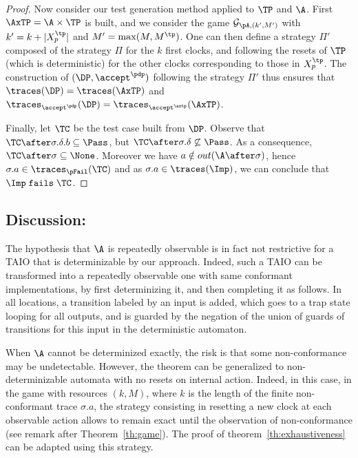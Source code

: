 \documentclass{LMCS}
\theoremstyle{plain}\newtheorem{proposition}[thm]{Proposition}
\begin{document}
\begin{proof}
  Now consider our test generation method applied to $\TP$ and $\A$.
  First $\AxTP=\A \times \TP$ is built, and we consider the game
  $\mathcal{G}_{\pA,(k',M')}$ with $k'= k + |X_p^\tp|$ and
  $M'=\max(M,M^\tp)$.  One can then define a strategy $\Pi'$ composed
  of the strategy $\Pi$ for the $k$ first clocks, and following the
  resets of $\TP$ (which is deterministic) for the other clocks
  corresponding to those in $X_p^\tp$.  The construction of
  $(\DP,\accept^\pdp)$ following the strategy $\Pi'$ thus ensures that
  $\traces(\DP) = \traces(\AxTP)$ and $\traces_{\accept^{\pdp}}(\DP) =
  \traces_{\accept^{\axtp}}(\AxTP)$.

  Finally, let $\TC$ be the test case built from $\DP$.  Observe that
  $\TC  \after \sigma.\delta.b \subseteq \Pass$, but $\TC  \after
  \sigma.\delta \not\subseteq \Pass$. As a consequence, $\TC \after
  \sigma \subseteq \None$. 
Moreover we have $a \notin out(\A \after \sigma)$, hence 
  $\sigma.a \in \traces_{\pFail}(\TC)$ and as
  $\sigma.a \in \traces(\Imp)$, we can conclude that  $\Imp \; {\tt fails} \;
  \TC$.
\end{proof}

\subsection*{Discussion:}
The hypothesis that $\A$ is repeatedly observable is in fact not
restrictive for a TAIO that is determinizable by our approach.
Indeed, such a TAIO can be transformed into a repeatedly observable
one with same conformant implementations, by first determinizing it,
and then completing it as follows.  In all locations, a transition
labeled by an input is added, which goes to a trap state looping for
all outputs, and is guarded by the negation of the union of guards of
transitions for this input in the deterministic automaton.


When $\A$ cannot be determinized exactly, the risk is that 
some non-conformance may be undetectable.
However, 
the theorem can be generalized to non-determinizable automata with no resets on internal action.
Indeed, in this case, in the game with resources $(k,M)$, 
where $k$ is the length of the finite non-conformant trace $\sigma.a$,
the strategy consisting in resetting a new clock at each observable
action allows to remain exact until the observation of non-conformance
(see remark after Theorem~\ref{th:game}).  The proof of
theorem~\ref{th:exhaustiveness} can be adapted using this strategy.
\end{document}
